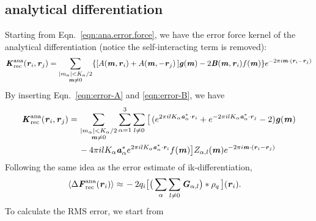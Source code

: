 \documentclass[aps,pre,preprint,unsortedaddress]{revtex4}
\renewcommand{\v}[1]{\textbf{\textit{#1}}}
\begin{document}
\subsection{analytical differentiation}
Starting from Eqn.~\eqref{eqn:ana.error.force}, we have the error force kernel
of the analytical differentiation (notice the self-interacting term is removed):
\begin{align}
  \v K^{\textrm{ana}}_{\textrm{rec}}(\v r_i, \v r_j)
  =
  \sum_{
    \begin{subarray}{c}
      \vert m_{\alpha}\vert < K_\alpha/2\\
      \v m\neq 0
    \end{subarray}}
  \{
  [A(\v m, \v r_i) + A(\v m,-\v r_j)\,]
  \v g(\v m) -
  2\v B(\v m,\v r_i) f(\v m)
  \}
  e^{-2\pi i\v m\cdot(\v r_i-\v r_j)}
\end{align}
By inserting Eqn.~\eqref{eqn:error-A} and \eqref{eqn:error-B}, we have
\begin{align}\nonumber
  \v K^{\textrm{ana}}_{\textrm{rec}}(\v r_i, \v r_j)
  =\,&
  \sum_{
    \begin{subarray}{c}
      \vert m_{\alpha}\vert < K_\alpha/2\\
      \v m\neq 0
    \end{subarray}}
  \sum_{\alpha=1}^3\sum_{l\neq 0}
  \big[
  \,(
  e^{2\pi i l K_\alpha\v a^\ast_\alpha\cdot \v r_i} +
  e^{-2\pi i l K_\alpha\v a^\ast_\alpha\cdot \v r_j}
  - 2
  )
  \v g(\v m)
  \\ 
  \,&
  - 4\pi i l K_\alpha\v a_\alpha^\ast e^{2\pi i l K_\alpha\v a^\ast_\alpha\cdot \v r_i}
  f(\v m)
  \big]
  Z_{\alpha,l}(\v m)
  e^{-2\pi i\v m\cdot(\v r_i-\v r_j)}  
\end{align}
Following  the same idea as the error estimate of  ik-differentiation,
\begin{align}
  \langle\Delta\v F^{\textrm{ana}}_{\textrm{rec}}(\v r_i)\rangle
  \approx\,&
  -2q_i
  \big[
  \big(
  \sum_{\alpha}\sum_{l\neq 0}\v G_{\alpha,l}
  \big)
  \ast\rho_q\,
  \big] (\v r_i).
\end{align}
To calculate the RMS error, we start from
\end{document}
